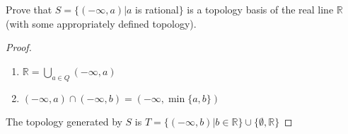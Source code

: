 \begin{problem}
Prove that $S=\{(-\infty,a) | a$ is rational$\}$ is a topology basis of the real line $\mathbb{R}$ (with some appropriately defined topology).
\end{problem}
\begin{solution}
\begin{proof}\mbox{}
\begin{enumerate}
\item $\displaystyle\mathbb{R}=\bigcup_{a\in Q} (-\infty,a)$
\item $(-\infty,a)\cap (-\infty,b)=(-\infty,\min\{a,b\})$
\end{enumerate}
The topology generated by $S$ is $T=\{(-\infty,b)|b\in \mathbb{R}\}\cup\{\emptyset,\mathbb{R}\}$
\end{proof}
\end{solution}

